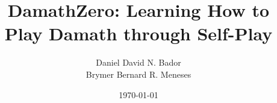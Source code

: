 \documentclass[12pt]{report}
\title{DamathZero: Learning How to Play Damath through Self-Play}
\author{Daniel David N. Bador \\ Brymer Bernard R. Meneses}
\date{\today}
\begin{document}
\maketitle




\tableofcontents

\listoffigures
\listoftables
\listofalgorithms












\end{document}

